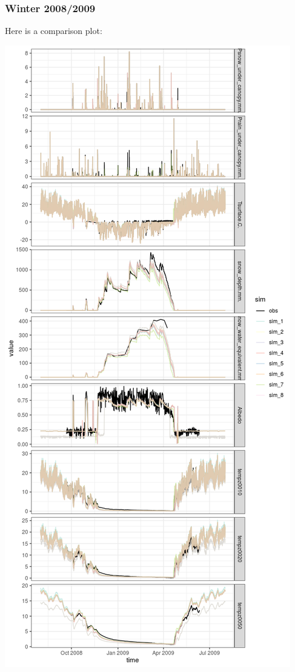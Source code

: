 \documentclass[
]{article}
\begin{document}
\hypertarget{winter-20082009}{%
\subsubsection{Winter 2008/2009}\label{winter-20082009}}

Here is a comparison plot:

\includegraphics{coldelaporte_v6_files/figure-latex/Winter_2008_2009-1.png}
\end{document}
